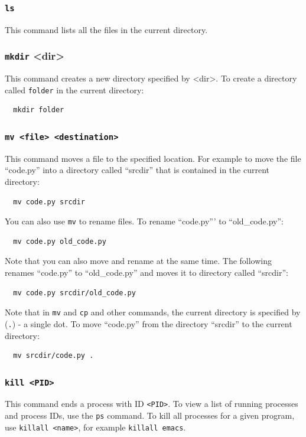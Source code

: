 \documentclass[10pt]{article}
\begin{document}
\subsubsection{\texttt{ls}}
\noindent This command lists all the files in the current directory.

\subsubsection{\texttt{mkdir} \textless dir\textgreater}
\noindent This command creates a new directory specified by \textless dir\textgreater.  To create a directory called \texttt{folder} in the current directory:

\begin{verbatim}
  mkdir folder
\end{verbatim}
	  
\subsubsection{\texttt{mv <file> <destination>}}
\noindent This command moves a file to the specified location.  For example to move the file ``code.py'' into a directory called ``srcdir'' that is contained in the current directory:

\begin{verbatim}
  mv code.py srcdir
\end{verbatim}

\noindent You can also use \texttt{mv} to rename files.  To rename ``code.py''' to ``old\_code.py'':
\begin{verbatim}
  mv code.py old_code.py
\end{verbatim}

\noindent Note that you can also move and rename at the same time.  The following renames ``code.py'' to ``old\_code.py'' and moves it to directory called ``srcdir'':
\begin{verbatim}
  mv code.py srcdir/old_code.py
\end{verbatim}

\noindent Note that in \texttt{mv} and \texttt{cp} and other commands, the current directory is specified by (\texttt{.}) - a single dot.  To move ``code.py'' from the directory ``srcdir'' to the current directory:
\begin{verbatim}
  mv srcdir/code.py .
\end{verbatim}

\subsubsection{\texttt{kill <PID>}}
\noindent This command ends a process with ID \verb|<PID>|.  To view a list of running processes and process IDs, use the \verb|ps| command.  To kill all processes for a given program,
use \verb|killall <name>|, for example \verb|killall emacs|.
\end{document}
